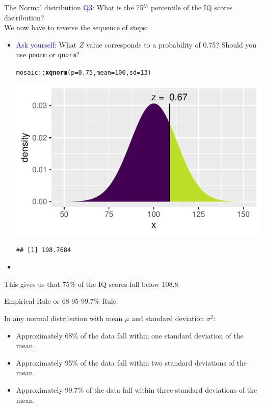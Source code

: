 \documentclass{beamer}\usepackage[]{graphicx}\usepackage[]{color}
\newcommand{\hlnum}[1]{\textcolor[rgb]{0.686,0.059,0.569}{#1}}%
\newcommand{\hlopt}[1]{\textcolor[rgb]{0,0,0}{#1}}%
\newcommand{\hlstd}[1]{\textcolor[rgb]{0.345,0.345,0.345}{#1}}%
\newcommand{\hlkwc}[1]{\textcolor[rgb]{0.333,0.667,0.333}{#1}}%
\newcommand{\hlkwd}[1]{\textcolor[rgb]{0.737,0.353,0.396}{\textbf{#1}}}%
\newenvironment{knitrout}{}{} %
\begin{document}
\begin{frame}[fragile]{The Normal distribution}
	\textcolor{blue}{Q3:}
	What is the 75$^{th}$ percentile of the IQ scores distribution? \\
	We now have to reverse the sequence of steps:
	\begin{itemize}
		\item \textcolor{blue}{Ask yourself:} What $Z$ value corresponds to a probability of 0.75? Should you use \texttt{pnorm} or \texttt{qnorm}? \pause

\begin{knitrout}\scriptsize
{}\color{fgcolor}
\begin{alltt}
\hlstd{mosaic}\hlopt{::}\hlkwd{xqnorm}\hlstd{(}\hlkwc{p} \hlstd{=} \hlnum{0.75}\hlstd{,} \hlkwc{mean} \hlstd{=} \hlnum{100}\hlstd{,} \hlkwc{sd} \hlstd{=} \hlnum{13}\hlstd{)}
\end{alltt}


{\centering \includegraphics[width=0.6\linewidth]{figure/probs8-1} 

}


\begin{verbatim}
## [1] 108.7684
\end{verbatim}

\end{knitrout}

		\item[]
	\end{itemize} This gives us that 75\% of the IQ scores fall below 108.8. 
\end{frame}


\begin{frame}[fragile]{Empirical Rule or 68-95-99.7\% Rule}

In any normal distribution with mean $\mu$ and standard deviation $\sigma^2$:
\begin{itemize}
			\setlength\itemsep{2em}
	\item Approximately 68\% of the data fall within one standard deviation of the mean.
\item Approximately 95\% of the data fall within two standard deviations of the mean.
\item Approximately 99.7\% of the data fall within three standard deviations of the mean.
\end{itemize}
\end{frame}
\end{document}
